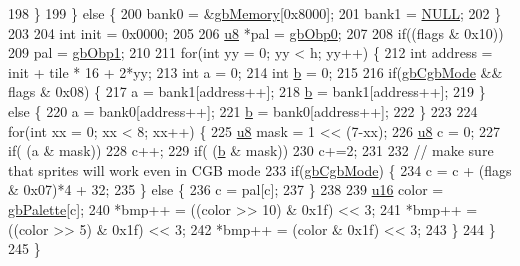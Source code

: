 \begin{DoxyCode}
198     \}
199   \} \textcolor{keywordflow}{else} \{
200     bank0 = &\mbox{\hyperlink{gb_globals_8cpp_a43f07d3a5fcb2301e2662188e888c5a1}{gbMemory}}[0x8000];
201     bank1 = \mbox{\hyperlink{getopt1_8c_a070d2ce7b6bb7e5c05602aa8c308d0c4}{NULL}};
202   \}
203   
204   \textcolor{keywordtype}{int} init = 0x0000;
205 
206   \mbox{\hyperlink{_system_8h_aed742c436da53c1080638ce6ef7d13de}{u8}} *pal = \mbox{\hyperlink{gb_globals_8cpp_ac4d1dd952085f2cbecc7663050994012}{gbObp0}};
207 
208   \textcolor{keywordflow}{if}((flags & 0x10))
209     pal = \mbox{\hyperlink{gb_globals_8cpp_a8200c8214bf94708e583eee237042d00}{gbObp1}};
210   
211   \textcolor{keywordflow}{for}(\textcolor{keywordtype}{int} yy = 0; yy < h; yy++) \{
212     \textcolor{keywordtype}{int} address = init + tile * 16 + 2*yy;
213     \textcolor{keywordtype}{int} a = 0;
214     \textcolor{keywordtype}{int} \mbox{\hyperlink{expr-lex_8cpp_a91b64995742fd30063314f12340b4b5a}{b}} = 0;
215     
216     \textcolor{keywordflow}{if}(\mbox{\hyperlink{gb_globals_8cpp_aa3e3449c9ba4db2eeb687d6facfca761}{gbCgbMode}} && flags & 0x08) \{
217       a = bank1[address++];
218       \mbox{\hyperlink{expr-lex_8cpp_a91b64995742fd30063314f12340b4b5a}{b}} = bank1[address++];
219     \} \textcolor{keywordflow}{else} \{
220       a = bank0[address++];
221       \mbox{\hyperlink{expr-lex_8cpp_a91b64995742fd30063314f12340b4b5a}{b}} = bank0[address++];
222     \}
223     
224     \textcolor{keywordflow}{for}(\textcolor{keywordtype}{int} xx = 0; xx < 8; xx++) \{
225       \mbox{\hyperlink{_system_8h_aed742c436da53c1080638ce6ef7d13de}{u8}} mask = 1 << (7-xx);
226       \mbox{\hyperlink{_system_8h_aed742c436da53c1080638ce6ef7d13de}{u8}} c = 0;
227       \textcolor{keywordflow}{if}( (a & mask))
228         c++;
229       \textcolor{keywordflow}{if}( (\mbox{\hyperlink{expr-lex_8cpp_a91b64995742fd30063314f12340b4b5a}{b}} & mask))
230         c+=2;
231       
232       \textcolor{comment}{// make sure that sprites will work even in CGB mode}
233       \textcolor{keywordflow}{if}(\mbox{\hyperlink{gb_globals_8cpp_aa3e3449c9ba4db2eeb687d6facfca761}{gbCgbMode}}) \{
234         c = c + (flags & 0x07)*4 + 32;
235       \} \textcolor{keywordflow}{else} \{
236         c = pal[c];
237       \}
238       
239       \mbox{\hyperlink{_system_8h_a9e6c91d77e24643b888dbd1a1a590054}{u16}} color = \mbox{\hyperlink{gb_globals_8cpp_a7c46bfb4d71e64d27d5aec543ba85b9a}{gbPalette}}[c];
240       *bmp++ = ((color >> 10) & 0x1f) << 3;
241       *bmp++ = ((color >> 5) & 0x1f) << 3;
242       *bmp++ = (color & 0x1f) << 3;
243     \}
244   \}
245 \}
\end{DoxyCode}
